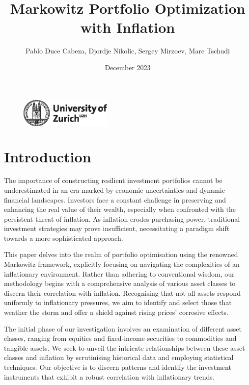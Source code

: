 \documentclass{article}
\title{Markowitz Portfolio Optimization with Inflation}
\author{Pablo Duce Cabeza, Djordje Nikolic, Sergey Mirzoev, Marc Tschudi}
\date{December 2023}
\begin{document}
\maketitle

\begin{figure}[h]
    \centering
    \includegraphics[width=0.4\textwidth]{figure/uzh_logo_e_pos.eps}
    \label{fig:mesh0}
\end{figure}

\newpage
\tableofcontents
\newpage
\listoffigures
\listoftables
\newpage

\section{Introduction}


The importance of constructing resilient investment portfolios cannot be underestimated in an era marked by economic uncertainties and dynamic financial landscapes. Investors face a constant challenge in preserving and enhancing the real value of their wealth, especially when confronted with the persistent threat of inflation. As inflation erodes purchasing power, traditional investment strategies may prove insufficient, necessitating a paradigm shift towards a more sophisticated approach.

This paper delves into the realm of portfolio optimisation using the renowned Markowitz framework, explicitly focusing on navigating the complexities of an inflationary environment. Rather than adhering to conventional wisdom, our methodology begins with a comprehensive analysis of various asset classes to discern their correlation with inflation. Recognising that not all assets respond uniformly to inflationary pressures, we aim to identify and select those that weather the storm and offer a shield against rising prices' corrosive effects.

The initial phase of our investigation involves an examination of different asset classes, ranging from equities and fixed-income securities to commodities and tangible assets. We seek to unveil the intricate relationships between these asset classes and inflation by scrutinising historical data and employing statistical techniques. Our objective is to discern patterns and identify the investment instruments that exhibit a robust correlation with inflationary trends.
\end{document}
